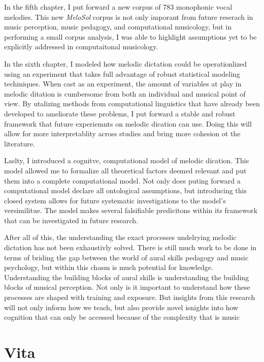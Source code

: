 \documentclass[12pt,]{book}
\begin{document}
In the fifth chapter, I put forward a new corpus of 783 monophonic vocal melodies.
This new \emph{MeloSol} corpus is not only imporant from future reserach in music perception, music pedagogy, and computational musicology, but in performing a small corpus analysis, I was able to highlight assumptions yet to be explicitly addressed in computaitonal musicology.

In the sixth chapter, I modeled how melodic dictation could be operationlized using an experiment that takes full advantage of robust statistical modeling techiniques.
When cast as an experiment, the amount of variables at play in melodic ditation is cumbersome from both an individual and musical point of view.
By utalizing methods from computational linguistics that have already been developed to ameliorate these problems, I put forward a stable and robust framework that future experiemnts on melodic dication can use.
Doing this will allow for more interpretablity across studies and bring more cohesion ot the literature.

Laslty, I introduced a cognitve, computational model of melodic dication.
This model allowed me to formalize all theoretical factors deemed relevant and put them into a complete computational model.
Not only does puting forward a computational model declare all ontological assumptions, but introducing this closed system allows for future systematic investigations to the model's versimilitue.
The model makes several falsifiable predicitons within its framework that can be investigated in future research.

After all of this, the understanding the exact processes undelrying melodic dictation has not been exhaustivly solved.
There is still much work to be done in terms of briding the gap between the world of aural skills pedagogy and music psychology, but within this chasm is much potential for knowledge.
Understanding the building blocks of aural skills is understanding the building blocks of musical perception.
Not only is it important to understand how these processes are shaped with training and exposure.
But insights from this research will not only inform how we teach, but also provide novel isnights into how cognition that can only be accessed because of the complexity that is music



\backmatter
\chapter{Vita}
\end{document}
